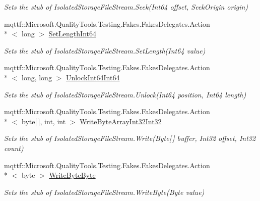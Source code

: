 \begin{DoxyCompactItemize}
\begin{DoxyCompactList}\small\item\em Sets the stub of Isolated\-Storage\-File\-Stream.\-Seek(\-Int64 offset, Seek\-Origin origin)\end{DoxyCompactList}\item 
mqttf\-::\-Microsoft.\-Quality\-Tools.\-Testing.\-Fakes.\-Fakes\-Delegates.\-Action\\*
$<$ long $>$ \hyperlink{class_system_1_1_i_o_1_1_isolated_storage_1_1_fakes_1_1_stub_isolated_storage_file_stream_a20952ce44d028dfd3cdd30dc94a1ab9f}{Set\-Length\-Int64}
\begin{DoxyCompactList}\small\item\em Sets the stub of Isolated\-Storage\-File\-Stream.\-Set\-Length(\-Int64 value)\end{DoxyCompactList}\item 
mqttf\-::\-Microsoft.\-Quality\-Tools.\-Testing.\-Fakes.\-Fakes\-Delegates.\-Action\\*
$<$ long, long $>$ \hyperlink{class_system_1_1_i_o_1_1_isolated_storage_1_1_fakes_1_1_stub_isolated_storage_file_stream_ac602d147d24ccbfc6de20df71faba068}{Unlock\-Int64\-Int64}
\begin{DoxyCompactList}\small\item\em Sets the stub of Isolated\-Storage\-File\-Stream.\-Unlock(\-Int64 position, Int64 length)\end{DoxyCompactList}\item 
mqttf\-::\-Microsoft.\-Quality\-Tools.\-Testing.\-Fakes.\-Fakes\-Delegates.\-Action\\*
$<$ byte\mbox{[}$\,$\mbox{]}, int, int $>$ \hyperlink{class_system_1_1_i_o_1_1_isolated_storage_1_1_fakes_1_1_stub_isolated_storage_file_stream_a1ab0e33e6720f2a19d43e0ed519638f2}{Write\-Byte\-Array\-Int32\-Int32}
\begin{DoxyCompactList}\small\item\em Sets the stub of Isolated\-Storage\-File\-Stream.\-Write(\-Byte\mbox{[}$\,$\mbox{]} buffer, Int32 offset, Int32 count)\end{DoxyCompactList}\item 
mqttf\-::\-Microsoft.\-Quality\-Tools.\-Testing.\-Fakes.\-Fakes\-Delegates.\-Action\\*
$<$ byte $>$ \hyperlink{class_system_1_1_i_o_1_1_isolated_storage_1_1_fakes_1_1_stub_isolated_storage_file_stream_a3727ac80b3b42db6739fe7b4369d3257}{Write\-Byte\-Byte}
\begin{DoxyCompactList}\small\item\em Sets the stub of Isolated\-Storage\-File\-Stream.\-Write\-Byte(\-Byte value)\end{DoxyCompactList}\item 

\end{DoxyCompactItemize}

